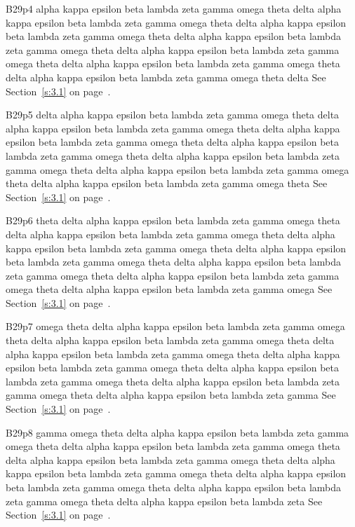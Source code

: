 B29p4 alpha kappa epsilon beta lambda zeta gamma omega theta delta alpha kappa epsilon beta lambda zeta gamma omega theta delta alpha kappa epsilon beta lambda zeta gamma omega theta delta alpha kappa epsilon beta lambda zeta gamma omega theta delta alpha kappa epsilon beta lambda zeta gamma omega theta delta alpha kappa epsilon beta lambda zeta gamma omega theta delta alpha kappa epsilon beta lambda zeta gamma omega theta delta See Section~\ref{s:3.1} on page~\pageref{s:3.1}.

B29p5 delta alpha kappa epsilon beta lambda zeta gamma omega theta delta alpha kappa epsilon beta lambda zeta gamma omega theta delta alpha kappa epsilon beta lambda zeta gamma omega theta delta alpha kappa epsilon beta lambda zeta gamma omega theta delta alpha kappa epsilon beta lambda zeta gamma omega theta delta alpha kappa epsilon beta lambda zeta gamma omega theta delta alpha kappa epsilon beta lambda zeta gamma omega theta See Section~\ref{s:3.1} on page~\pageref{s:3.1}.

B29p6 theta delta alpha kappa epsilon beta lambda zeta gamma omega theta delta alpha kappa epsilon beta lambda zeta gamma omega theta delta alpha kappa epsilon beta lambda zeta gamma omega theta delta alpha kappa epsilon beta lambda zeta gamma omega theta delta alpha kappa epsilon beta lambda zeta gamma omega theta delta alpha kappa epsilon beta lambda zeta gamma omega theta delta alpha kappa epsilon beta lambda zeta gamma omega See Section~\ref{s:3.1} on page~\pageref{s:3.1}.

B29p7 omega theta delta alpha kappa epsilon beta lambda zeta gamma omega theta delta alpha kappa epsilon beta lambda zeta gamma omega theta delta alpha kappa epsilon beta lambda zeta gamma omega theta delta alpha kappa epsilon beta lambda zeta gamma omega theta delta alpha kappa epsilon beta lambda zeta gamma omega theta delta alpha kappa epsilon beta lambda zeta gamma omega theta delta alpha kappa epsilon beta lambda zeta gamma See Section~\ref{s:3.1} on page~\pageref{s:3.1}.

B29p8 gamma omega theta delta alpha kappa epsilon beta lambda zeta gamma omega theta delta alpha kappa epsilon beta lambda zeta gamma omega theta delta alpha kappa epsilon beta lambda zeta gamma omega theta delta alpha kappa epsilon beta lambda zeta gamma omega theta delta alpha kappa epsilon beta lambda zeta gamma omega theta delta alpha kappa epsilon beta lambda zeta gamma omega theta delta alpha kappa epsilon beta lambda zeta See Section~\ref{s:3.1} on page~\pageref{s:3.1}.

